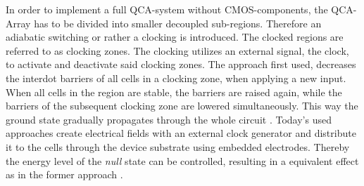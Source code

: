 In order to implement a full QCA-system without CMOS-components, the QCA-Array has to be divided into smaller decoupled sub-regions. Therefore an adiabatic switching or rather a clocking is introduced. The clocked regions are referred to as clocking zones. The clocking utilizes an external signal, the clock, to activate and deactivate said clocking zones. The approach first used, decreases the interdot barriers of all cells in a clocking zone, when applying a new input. When all cells in the region are stable, the barriers are raised again, while the barriers of the subsequent clocking zone are lowered simultaneously. This way the ground state gradually propagates through the whole circuit \cite{lent1997device}. Today's used approaches create electrical fields with an external clock generator and distribute it to the cells through the device substrate using embedded electrodes. Thereby the energy level of the \textit{null} state can be controlled, resulting in a equivalent effect as in the former approach \cite{Walter}.\\


